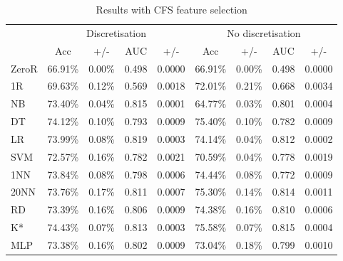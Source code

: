 \begin{table}[htbp]
\caption{Results with CFS feature selection}
\begin{tabular}{|l|cccc|cccc|}
\hline
 & \multicolumn{ 4}{c|}{Discretisation} & \multicolumn{ 4}{c|}{No discretisation} \\ 
  & Acc & +/- & AUC & +/- & Acc & +/- & AUC & +/- \\ \hline
  ZeroR & 66.91\% & 0.00\% & 0.498 & 0.0000 & 66.91\% & 0.00\% & 0.498 & 0.0000 \\ 
  1R & 69.63\% & 0.12\% & 0.569 & 0.0018 & 72.01\% & 0.21\% & 0.668 & 0.0034 \\ 
  NB & 73.40\% & 0.04\% & 0.815 & 0.0001 & 64.77\% & 0.03\% & 0.801 & 0.0004 \\ 
  DT & 74.12\% & 0.10\% & 0.793 & 0.0009 & 75.40\% & 0.10\% & 0.782 & 0.0009 \\ 
  LR & 73.99\% & 0.08\% & 0.819 & 0.0003 & 74.14\% & 0.04\% & 0.812 & 0.0002 \\ 
  SVM & 72.57\% & 0.16\% & 0.782 & 0.0021 & 70.59\% & 0.04\% & 0.778 & 0.0019 \\ 
  1NN & 73.84\% & 0.08\% & 0.798 & 0.0006 & 74.44\% & 0.08\% & 0.772 & 0.0009 \\ 
  20NN & 73.76\% & 0.17\% & 0.811 & 0.0007 & 75.30\% & 0.14\% & 0.814 & 0.0011 \\ 
  RD & 73.39\% & 0.16\% & 0.806 & 0.0009 & 74.38\% & 0.16\% & 0.810 & 0.0006 \\ 
  K* & 74.43\% & 0.07\% & 0.813 & 0.0003 & 75.58\% & 0.07\% & 0.815 & 0.0004 \\ 
  MLP & 73.38\% & 0.16\% & 0.802 & 0.0009 & 73.04\% & 0.18\% & 0.799 & 0.0010 \\ \hline
  \end{tabular}
  \label{}
  \end{table}
